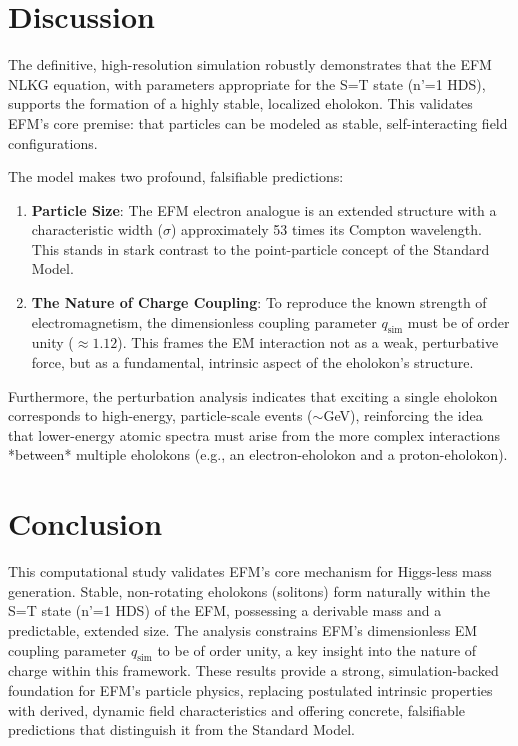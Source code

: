 \documentclass[11pt]{article}
\begin{document}
\section{Discussion}
The definitive, high-resolution simulation robustly demonstrates that the EFM NLKG equation, with parameters appropriate for the S=T state (n'=1 HDS), supports the formation of a highly stable, localized eholokon. This validates EFM's core premise: that particles can be modeled as stable, self-interacting field configurations.

The model makes two profound, falsifiable predictions:
\begin{enumerate}
    \item \textbf{Particle Size}: The EFM electron analogue is an extended structure with a characteristic width (\(\sigma\)) approximately 53 times its Compton wavelength. This stands in stark contrast to the point-particle concept of the Standard Model.
    \item \textbf{The Nature of Charge Coupling}: To reproduce the known strength of electromagnetism, the dimensionless coupling parameter \(q_{\text{sim}}\) must be of order unity (\(\approx 1.12\)). This frames the EM interaction not as a weak, perturbative force, but as a fundamental, intrinsic aspect of the eholokon's structure.
\end{enumerate}
Furthermore, the perturbation analysis indicates that exciting a single eholokon corresponds to high-energy, particle-scale events (\(\sim\)GeV), reinforcing the idea that lower-energy atomic spectra must arise from the more complex interactions *between* multiple eholokons (e.g., an electron-eholokon and a proton-eholokon).

\section{Conclusion}
This computational study validates EFM's core mechanism for Higgs-less mass generation. Stable, non-rotating eholokons (solitons) form naturally within the S=T state (n'=1 HDS) of the EFM, possessing a derivable mass and a predictable, extended size. The analysis constrains EFM's dimensionless EM coupling parameter \(q_{\text{sim}}\) to be of order unity, a key insight into the nature of charge within this framework. These results provide a strong, simulation-backed foundation for EFM's particle physics, replacing postulated intrinsic properties with derived, dynamic field characteristics and offering concrete, falsifiable predictions that distinguish it from the Standard Model.
\end{document}
